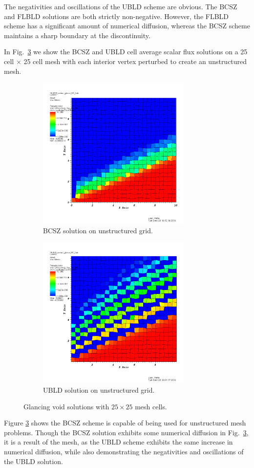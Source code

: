 \documentclass{mc2015}
\newcommand{\fig}[1]{Fig.~\ref{#1}}                      %
\begin{document}
The negativities and oscillations of the UBLD scheme are obvious.  The BCSZ and FLBLD solutions are both strictly non-negative.  
However, the FLBLD scheme has a significant amount of numerical diffusion, whereas the BCSZ scheme maintains a sharp boundary at the discontinuity.

In \fig{fig:unstructured} we show the BCSZ and UBLD cell average scalar flux solutions on a 25 cell $\times$ 25 cell mesh with each interior vertex perturbed to create an unstructured mesh.
\begin{figure}[h]
	\begin{center}
	\begin{subfigure}{0.45\textwidth}
		\includegraphics[width=3in]{bcsz_unstruct.png}
		\caption{BCSZ solution on unstructured grid.}
		\label{fig:unstructured_bcsz}
	\end{subfigure}	
	\begin{subfigure}{0.45\textwidth}
		\includegraphics[width=3in]{bild_unstruct.png}
		\caption{UBLD solution on unstructured grid.}		
		\label{fig:unstructured_bild}
	\end{subfigure}
	\caption{Glancing void solutions with $25\times 25$ mesh cells.}
	\label{fig:unstructured}
	\end{center}	
\end{figure}
Figure \ref{fig:unstructured} shows the BCSZ scheme is capable of being used for unstructured mesh problems.
Though the BCSZ solution exhibits some numerical diffusion in \fig{fig:unstructured}, it is a result of the mesh, as the UBLD scheme exhibits the same increase in numerical diffusion, while also demonstrating the negativities and oscillations of the UBLD solution.
\end{document}
